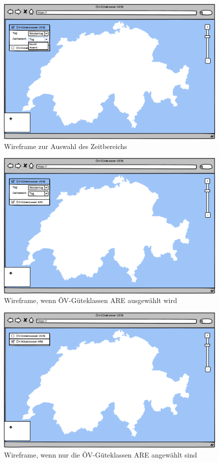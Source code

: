 \begin{figure}[p]
    \centering
    \includegraphics[width=0.8\linewidth]{projectdoc/img/wireframes/zeitbereich_auswahl.png}
    \caption[Wireframe zur Auswahl des Zeitbereichs]{Wireframe zur Auswahl des Zeitbereichs}
    \label{fig:wireframe_auswahl_zeitbereich}
\end{figure}

\begin{figure}[p]
    \centering
    \includegraphics[width=0.8\linewidth]{projectdoc/img/wireframes/are_selected.png}
    \caption[Wireframe, wenn ÖV-Güteklassen ARE ausgewählt wird]{Wireframe, wenn ÖV-Güteklassen ARE ausgewählt wird}
    \label{fig:wireframe_are_selected}
\end{figure}

\begin{figure}[p]
    \centering
    \includegraphics[width=0.8\linewidth]{projectdoc/img/wireframes/only_ARE.png}
    \caption[Wireframe, wenn nur die ÖV-Güteklassen ARE angewählt sind]{Wireframe, wenn nur die ÖV-Güteklassen ARE angewählt sind}
    \label{fig:wireframe_delesected}
\end{figure}

